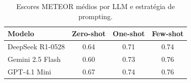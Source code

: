 \begin{table}[ht]
\centering
\caption{Escores METEOR médios por LLM e estratégia de prompting.}
\label{tab:acuracia}
\begin{tabular}{lccc}
\hline
\textbf{Modelo} & \textbf{Zero-shot} & \textbf{One-shot} & \textbf{Few-shot} \\
\hline
DeepSeek R1-0528 & 0.64 & 0.71 & 0.74 \\
Gemini 2.5 Flash & 0.60 & 0.73 & 0.76 \\
GPT-4.1 Mini & 0.67 & 0.74 & 0.76 \\
\hline
\end{tabular}
\end{table}
